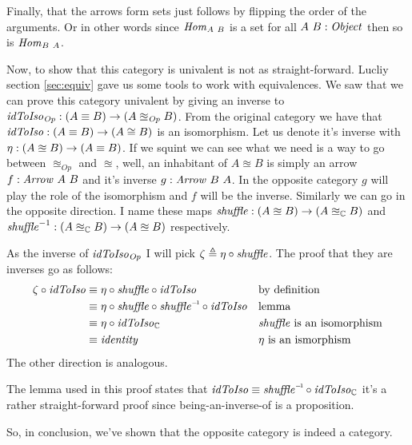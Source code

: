 Finally, that the arrows form sets just follows by flipping the order of the
arguments. Or in other words since $\mathit{Hom}_{A\ B}$ is a set for all $A\ B \mathrel{:}
\mathit{Object}$ then so is $\mathit{Hom}_{B\ A}$.

Now, to show that this category is univalent is not as straight-forward. Lucliy
section \ref{sec:equiv} gave us some tools to work with equivalences.
We saw that we
can prove this category univalent by giving an inverse to
$\mathit{idToIso}_{\mathit{Op}} \mathrel{:} (A \equiv B) \to (A \approxeq_{\mathit{Op}} B)$.
From the original category we have that $\mathit{idToIso} \mathrel{:} (A \equiv B) \to (A \cong
B)$ is an isomorphism. Let us denote it's inverse with $\eta \mathrel{:} (A \approxeq B)
\to (A \equiv B)$. If we squint we can see what we need is a way to go between
$\approxeq_{\mathit{Op}}$ and $\approxeq$, well, an inhabitant of $A \approxeq
B$ is simply an arrow $f \mathrel{:} \mathit{Arrow}\ A\ B$ and it's inverse $g \mathrel{:}
\mathit{Arrow}\ B\ A$. In the opposite category $g$ will play the role of the
isomorphism and $f$ will be the inverse. Similarly we can go in the opposite
direction. I name these maps $\mathit{shuffle} \mathrel{:} (A \approxeq B) \to (A
\approxeq_{\mathbb{C}} B)$ and $\mathit{shuffle}^{-1} \mathrel{:} (A \approxeq_{\mathbb{C}} B) \to (A
\approxeq B)$ respectively.

As the inverse of $\mathit{idToIso}_{\mathit{Op}}$ I will pick $\zeta \mathrel{\triangleq} \eta \circ
\mathit{shuffle}$. The proof that they are inverses go as follows:
%
\begin{align*}
\zeta \comp \idToIso & \equiv
\eta \comp \var{shuffle} \comp \idToIso
&& \text{by definition} \\
%
& \equiv
\eta \comp \var{shuffle} \comp \inv{\var{shuffle}} \comp \idToIso
&& \text{lemma} \\
& \equiv
\eta \comp \idToIso_{\bC}
&& \text{$\var{shuffle}$ is an isomorphism} \\
& \equiv
\identity
&& \text{$\eta$ is an ismorphism}
\end{align*}
%
The other direction is analogous.

The lemma used in this proof states that $\idToIso \equiv \inv{\var{shuffle}} \comp
\idToIso_{\bC}$ it's a rather straight-forward proof since being-an-inverse-of
is a proposition.

So, in conclusion, we've shown that the opposite category is indeed a category.

